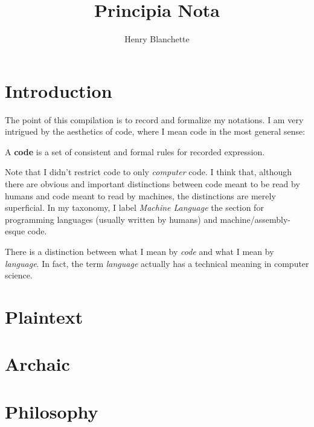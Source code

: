 \documentclass{article}
\title{Principia Nota}
\author{Henry Blanchette}
\date{}
\newcommand{\definition}[1]{
	\vspace{10px}
	\noindent {\sc Definition.} #1
	\vspace{10px}
}
\begin{document}
\maketitle
\tableofcontents

\newpage

\section{Introduction}

The point of this compilation is to record and formalize my notations. I am very intrigued by the aesthetics of code, where I mean code in the most general sense:

\definition{A \textbf{code} is a set of consistent and formal rules for recorded expression.}

Note that I didn't restrict code to only \textit{computer} code. I think that, although there are obvious and important distinctions between code meant to be read by humans and code meant to read by machines, the distinctions are merely superficial. In my taxonomy, I label \textit{Machine Language} the section for programming languages (usually written by humans) and machine/assembly-esque code.

There is a distinction between what I mean by \textit{code} and what I mean by \textit{language}. In fact, the term \textit{language} actually has a technical meaning in computer science.

\newpage

	
\section{Plaintext}

\section{Archaic}

\section{Philosophy}
\end{document}
